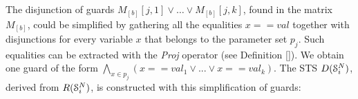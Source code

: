 %
%
%
%
%

The disjunction of guards $M_{[b]}[j,1] \vee \dots \vee
M_{[b]}[j,k]$, found in the matrix $M_{[b]}$, could be simplified
by gathering all the equalities $x==val$ together with
disjunctions for every variable $x$ that belongs to the parameter
set $p_j$. Such equalities can be extracted with the
\textit{Proj} operator (see Definition \ref{}). We
obtain one guard of the form $\bigwedge_{x \in p_j}(x==val_1 \vee
... \vee x==val_k)$. The STS $D(\EuScript{S}_i^{N})$, derived
from $R(\EuScript{S}_i^{N})$, is constructed with this
simplification of guards:


